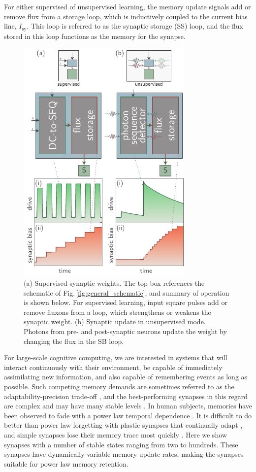 \documentclass[twocolumn]{article}
\begin{document}
For either supervised of unsupervised learning, the memory update signals add or remove flux from a storage loop, which is inductively coupled to the current bias line, $I_{\mathrm{sy}}$. This loop is referred to as the synaptic storage (SS) loop, and the flux stored in this loop functions as the memory for the synapse.
\begin{figure}[t!]
	\centerline{\includegraphics[width=8.6cm]{_synapticPlasticity_schematic_small.pdf}}
	\caption{\label{fig:synapticPlasticity_schematic}(a) Supervised synaptic weights. The top box references the schematic of Fig.\,\ref{fig:general_schematic}, and summary of operation is shown below. For supervised learning, input square pulses add or remove fluxons from a loop, which strengthens or weakens the synaptic weight. (b) Synaptic update in unsupervised mode. Photons from pre- and post-synaptic neurons update the weight by changing the flux in the SB loop.}
\end{figure}

For large-scale cognitive computing, we are interested in systems that will interact continuously with their environment, be capable of immediately assimilating new information, and also capable of remembering events as long as possible. Such competing memory demands are sometimes referred to as the adaptability-precision trade-off \cite{khso2017}, and the best-performing synapses in this regard are complex \cite{fudr2005} and may have many stable levels \cite{fuab2007}. In human subjects, memories have been observed to fade with a power law temporal dependence \cite{wieb1991,wieb1997}. It is difficult to do better than power law forgetting with plastic synapses that continually adapt \cite{fudr2005}, and simple synapses lose their memory trace most quickly \cite{fuab2007}. Here we show synapses with a number of stable states ranging from two to hundreds. These synapses have dynamically variable memory update rates, making the synapses suitable for power law memory retention.
\end{document}
